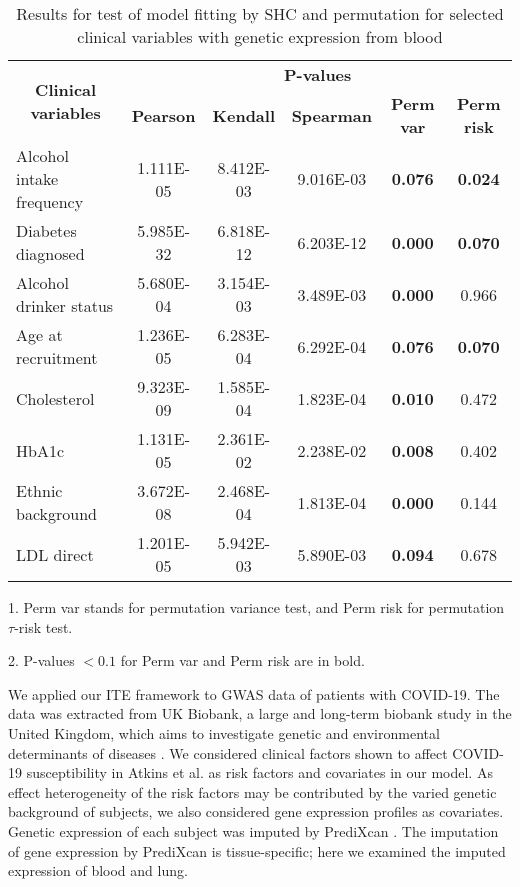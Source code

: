     \begin{table}[htbp]
      \centering
      \caption{Results for test of model fitting by SHC and permutation for selected clinical variables with genetic expression from blood}
      \begin{threeparttable}
        \begin{tabular}{lccccc}
        \toprule
        \multicolumn{1}{c}{\multirow{2}[0]{*}{\textbf{Clinical variables}}} & \multicolumn{5}{c}{\textbf{P-values}} \\
              & \textbf{Pearson} & \textbf{Kendall } & \textbf{Spearman } & \textbf{Perm var} & \textbf{Perm risk} \\
        \midrule
        Alcohol intake frequency & 1.111E-05 & 8.412E-03 & 9.016E-03 & \textbf{0.076} & \textbf{0.024} \\
        Diabetes diagnosed & 5.985E-32 & 6.818E-12 & 6.203E-12 & \textbf{0.000} & \textbf{0.070} \\
        Alcohol drinker status & 5.680E-04 & 3.154E-03 & 3.489E-03 & \textbf{0.000} & 0.966 \\
        Age at recruitment & 1.236E-05 & 6.283E-04 & 6.292E-04 & \textbf{0.076} & \textbf{0.070} \\
        Cholesterol & 9.323E-09 & 1.585E-04 & 1.823E-04 & \textbf{0.010} & 0.472 \\
        HbA1c & 1.131E-05 & 2.361E-02 & 2.238E-02 & \textbf{0.008} & 0.402 \\
        Ethnic background & 3.672E-08 & 2.468E-04 & 1.813E-04 & \textbf{0.000} & 0.144 \\
        LDL direct & 1.201E-05 & 5.942E-03 & 5.890E-03 & \textbf{0.094} & 0.678 \\
        \bottomrule
        \end{tabular}%
        \begin{tablenotes}
          \small
          \item 1. Perm var stands for permutation variance test, and Perm risk for permutation $\tau$-risk test. 
          \item 2. P-values $< 0.1$ for Perm var and Perm risk are in bold.
        \end{tablenotes}
      \end{threeparttable}
      \label{tab:ite_blood_result}%
    \end{table}%

    We applied our ITE framework to GWAS data of patients with COVID-19. The data was extracted from UK Biobank, a large and long-term biobank study in the United Kingdom, which aims to investigate genetic and environmental determinants of diseases \cite{biobank2014uk}. We considered clinical factors shown to affect COVID-19 susceptibility in Atkins et al.\cite{atkins2020preexisting} as risk factors and covariates in our model. As effect heterogeneity of the risk factors may be contributed by the varied genetic background of subjects, we also considered gene expression profiles as covariates. Genetic expression of each subject was imputed by PrediXcan \cite{gamazon2015gene}. The imputation of gene expression by PrediXcan is tissue-specific; here we examined the imputed expression of blood and lung.
    
